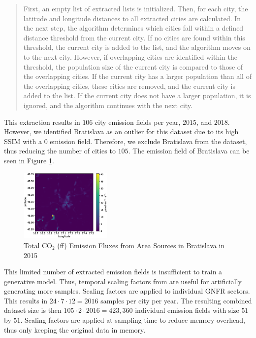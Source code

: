 \begin{quotation}
First, an empty list of extracted lists is initialized.
Then, for each city, the latitude and longitude distances to all extracted cities are calculated.
In the next step, the algorithm determines which cities fall within a defined distance threshold from the current city.
If no cities are found within this threshold, the current city is added to the list, and the algorithm moves on to the next city.
However, if overlapping cities are identified within the threshold, the population size of the current city is compared to those of the overlapping cities.
If the current city has a larger population than all of the overlapping cities, these cities are removed, and the current city is added to the list.
If the current city does not have a larger population, it is ignored, and the algorithm continues with the next city.
\end{quotation}

This extraction results in $106$ city emission fields per year, $2015$, and $2018$.
However, we identified Bratislava as an outlier for this dataset due to its high \gls{SSIM} with a $0$ emission field.
Therefore, we exclude Bratislava from the dataset, thus reducing the number of cities to $105$.
The emission field of Bratislava can be seen in Figure \ref{fig:bratislava}.

\begin{figure}[htb]
    \centering
    \includegraphics[width=0.4\textwidth]{figures/03_dataset/bratislava/bratislava.eps}
    \caption{Total $\text{CO}_2$ (ff) Emission Fluxes from Area Sources in Bratislava in 2015 \parencite{TNO_HighRes15}}
    \label{fig:bratislava}
\end{figure}


This limited number of extracted emission fields is insufficient to train a generative model.
Thus, temporal scaling factors from \parencite{ScalingFactors} are useful for artificially generating more samples.
Scaling factors are applied to individual GNFR sectors.
This results in $24 \cdot 7 \cdot 12 = 2016$ samples per city per year.
The resulting combined dataset size is then $105 \cdot 2 \cdot 2016 = 423,360$ individual emission fields with size $51$ by $51$.
Scaling factors are applied at sampling time to reduce memory overhead, thus only keeping the original data in memory.

